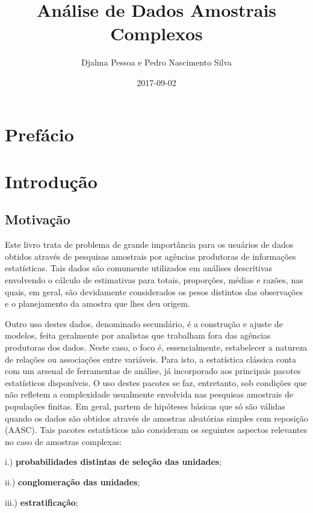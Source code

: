 \documentclass[]{book}
\title{Análise de Dados Amostrais Complexos}
\author{Djalma Pessoa e Pedro Nascimento Silva}
\date{2017-09-02}
\theoremstyle{definition}
\theoremstyle{definition}
\theoremstyle{remark}
\begin{document}
\maketitle

{
\setcounter{tocdepth}{1}
\tableofcontents
}
\chapter*{Prefácio}\label{prefacio}

\chapter{Introdução}\label{introduc}

\section{Motivação}\label{motivacao}

Este livro trata de problema de grande importância para os usuários de
dados obtidos através de pesquisas amostrais por agências produtoras de
informações estatísticas. Tais dados são comumente utilizados em
análises descritivas envolvendo o cálculo de estimativas para totais,
proporções, médias e razões, nas quais, em geral, são devidamente
considerados os pesos distintos das observações e o planejamento da
amostra que lhes deu origem.

Outro uso destes dados, denominado secundário, é a construção e ajuste
de modelos, feita geralmente por analistas que trabalham fora das
agências produtoras dos dados. Neste caso, o foco é, essencialmente,
estabelecer a natureza de relações ou associações entre variáveis. Para
isto, a estatística clássica conta com um arsenal de ferramentas de
análise, já incorporado aos principais pacotes estatísticos disponíveis.
O uso destes pacotes se faz, entretanto, sob condições que não refletem
a complexidade usualmente envolvida nas pesquisas amostrais de
populações finitas. Em geral, partem de hipóteses básicas que só são
válidas quando os dados são obtidos através de amostras aleatórias
simples com reposição (AASC). Tais pacotes estatísticos não consideram
os seguintes aspectos relevantes no caso de amostras complexas:

i.) \textbf{probabilidades distintas de seleção das unidades};

ii.) \textbf{conglomeração das unidades};

iii.) \textbf{estratificação};
\end{document}
